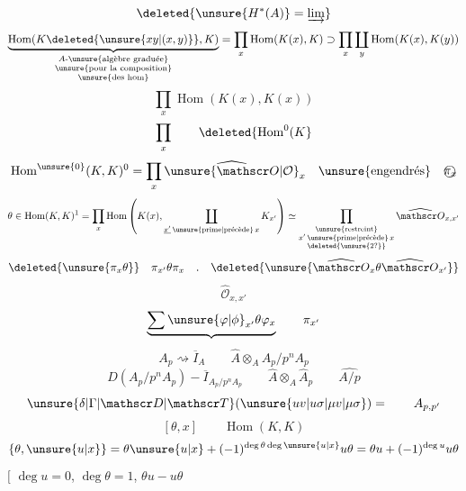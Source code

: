 \[
\deleted{\unsure{H^*(A)}=\varinjlim}
\]
\[
\underbrace{\operatorname{Hom}(K\deleted{\unsure{xy|(x,y)}},K)}_{\substack{A\text{-\unsure{algèbre graduée}}\\\text{\unsure{pour la composition}}\\\text{\unsure{des hom}}}}
=\prod_x\operatorname{Hom}(K(x),K)\supset\prod_x\coprod_y\operatorname{Hom}(K(x),K(y))
\]
\[
\prod_x\operatorname{Hom}(K(x),K(x))
\]
\[
\prod_x\qquad\deleted{\operatorname{Hom}^{0}(K}
\]
\[
\operatorname{Hom}^{\unsure{0}}(K,K)^0=\prod_x\widehat{\unsure{\mathscr O|\mathcal O}}_x
\quad\text{\unsure{engendrés}}\quad\text{\textcircled{$\pi_x$}}
\]
\[
\theta\in\operatorname{Hom}(K,K)^1=\prod_x\operatorname{Hom}\left(K(x),\coprod_{\substack{\underline{x'}\,\text{\unsure{prime|précède}}\,x}}K_{x'}\right)
\simeq\prod_{\substack{\text{\unsure{restreint}}\\x'\,\text{\unsure{prime|précède}}\,x\\\deleted{\unsure{2?}}}}\widehat{\mathscr O}_{x,x'}
\]
\[
\deleted{\unsure{\pi_x\theta}}\quad\pi_{x'}\theta\pi_x\quad.\quad
\deleted{\unsure{\widehat{\mathscr O}_x\theta\widehat{\mathscr O}_{x'}}}
\]
\[
\widehat{\mathscr O}_{x,x'}
\]
\[
\underbrace{\sum{\unsure{\varphi|\phi}}_{x'}\theta\varphi_x}\qquad\pi_{x'}
\]
\[
A_p\rightsquigarrow\overline I_A\qquad\widehat A\otimes_A A_p/p^nA_p
\]
\[
D(A_p/p^nA_p)-\overline I_{A_p/p^nA_p}\qquad
\widehat A\otimes_A\widehat A_p\qquad\widehat{A/p}
\]
\[
\unsure{\delta|\Gamma|\mathscr D|\mathscr T}(\unsure{uv|u\sigma|\mu v|\mu\sigma})=\qquad A_{p,p'}
\]
\[
[\theta,x]\qquad\operatorname{Hom}(K,K)
\]
\[
\{\theta,\unsure{u|x}\}=\theta\unsure{u|x}+(-1)^{\deg\theta\deg\unsure{u|x}}u\theta
=\theta u+(-1)^{\deg u}u\theta
\]
$[$ $\deg u=0$, $\deg\theta=1$,  $\theta u-u\theta$
